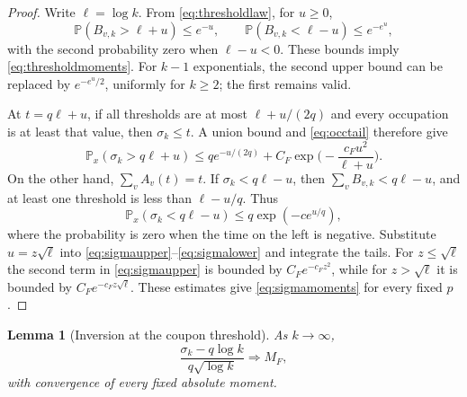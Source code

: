\documentclass[11pt]{amsart}
\newtheorem{lemma}[theorem]{Lemma}
\theoremstyle{remark}
\numberwithin{equation}{section}
\newcommand{\Prob}{\mathbb{P}}
\begin{document}
\begin{proof}
Write $\ell=\log k$. From \eqref{eq:thresholdlaw}, for $u\ge 0$,
\[
\Prob(B_{v,k}>\ell+u)\le e^{-u},\qquad \Prob(B_{v,k}<\ell-u)\le e^{-e^u},
\]
with the second probability zero when $\ell-u<0$. These bounds imply \eqref{eq:thresholdmoments}. For $k-1$ exponentials, the second upper bound can be replaced by $e^{-e^u/2}$, uniformly for $k\ge 2$; the first remains valid.

At $t=q\ell+u$, if all thresholds are at most $\ell+u/(2q)$ and every occupation is at least that value, then $\sigma_k\le t$. A union bound and \eqref{eq:occtail} therefore give
\begin{equation}\label{eq:sigmaupper}
\Prob_x(\sigma_k>q\ell+u)\le qe^{-u/(2q)}+C_F\exp\Big(-\frac{c_Fu^2}{\ell+u}\Big).
\end{equation}
On the other hand, $\sum_vA_v(t)=t$. If $\sigma_k<q\ell-u$, then $\sum_vB_{v,k}<q\ell-u$, and at least one threshold is less than $\ell-u/q$. Thus
\begin{equation}\label{eq:sigmalower}
\Prob_x(\sigma_k<q\ell-u)\le q\exp(-ce^{u/q}),
\end{equation}
where the probability is zero when the time on the left is negative. Substitute $u=z\sqrt\ell$ into \eqref{eq:sigmaupper}--\eqref{eq:sigmalower} and integrate the tails. For $z\le\sqrt\ell$ the second term in \eqref{eq:sigmaupper} is bounded by $C_Fe^{-c_Fz^2}$, while for $z>\sqrt\ell$ it is bounded by $C_Fe^{-c_Fz\sqrt\ell}$. These estimates give \eqref{eq:sigmamoments} for every fixed $p$.
\end{proof}

\begin{lemma}[Inversion at the coupon threshold]\label{lem:inversion}
As $k\to\infty$,
\begin{equation}\label{eq:inversion}
\frac{\sigma_k-q\log k}{q\sqrt{\log k}}\Longrightarrow M_F,
\end{equation}
with convergence of every fixed absolute moment.
\end{lemma}
\end{document}
